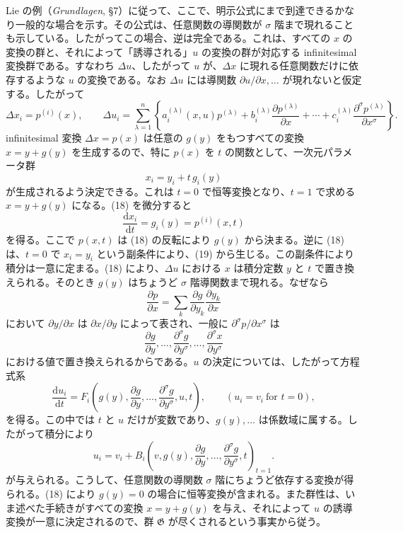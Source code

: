 \documentclass[11pt]{article}
\newcommand{\D}{\Delta}
\providecommand{\dd}{\mathrm d}
\providecommand{\G}{\mathfrak G}
\providecommand{\p}{\partial}
\begin{document}
Lie の例（\emph{Grundlagen}, \S{}7）に従って、ここで、明示公式にまで到達できるかなり一般的な場合を示す。その公式は、任意関数の導関数が \(\sigma\) 階まで現れることも示している。したがってこの場合、逆は完全である。これは、すべての \(x\) の変換の群と、それによって「誘導される」\(u\) の変換の群が対応する infinitesimal 変換群である。すなわち \(\D u\)、したがって \(u\) が、\(\D x\) に現れる任意関数だけに依存するような \(u\) の変換である。なお \(\D u\) には導関数 \(\p u/\p x,\ldots\) が現れないと仮定する。したがって
\[
\D x_i=p^{(i)}(x),\qquad
\D u_i=
\sum_{\lambda=1}^{n}\left\{
a_i^{(\lambda)}(x,u)p^{(\lambda)}
+b_i^{(\lambda)}\frac{\p p^{(\lambda)}}{\p x}
+\cdots+
c_i^{(\lambda)}\frac{\p^\sigma p^{(\lambda)}}{\p x^\sigma}
\right\}.
\]
infinitesimal 変換 \(\D x=p(x)\) は任意の \(g(y)\) をもつすべての変換 \(x=y+g(y)\) を生成するので、特に \(p(x)\) を \(t\) の関数として、一次元パラメータ群
\begin{equation}
x_i=y_i+t\,g_i(y)
\tag{18}
\end{equation}
が生成されるよう決定できる。これは \(t=0\) で恒等変換となり、\(t=1\) で求める \(x=y+g(y)\) になる。(18) を微分すると
\begin{equation}
\frac{\dd x_i}{\dd t}=g_i(y)=p^{(i)}(x,t)
\tag{19}
\end{equation}
を得る。ここで \(p(x,t)\) は (18) の反転により \(g(y)\) から決まる。逆に (18) は、\(t=0\) で \(x_i=y_i\) という副条件により、(19) から生じる。この副条件により積分は一意に定まる。(18) により、\(\D u\) における \(x\) は積分定数 \(y\) と \(t\) で置き換えられる。そのとき \(g(y)\) はちょうど \(\sigma\) 階導関数まで現れる。なぜなら
\[
\frac{\p p}{\p x}=\sum_k\frac{\p g}{\p y_k}\frac{\p y_k}{\p x}
\]
において \(\p y/\p x\) は \(\p x/\p y\) によって表され、一般に \(\p^\sigma p/\p x^\sigma\) は
\[
\frac{\p g}{\p y},\ldots,\frac{\p^\sigma g}{\p y^\sigma},\ldots,\frac{\p^\sigma x}{\p y^\sigma}
\]
における値で置き換えられるからである。\(u\) の決定については、したがって方程式系
\[
\frac{\dd u_i}{\dd t}
=
F_i\!\left(g(y),\frac{\p g}{\p y},\ldots,\frac{\p^\sigma g}{\p y^\sigma},u,t\right),
\qquad (u_i=v_i\ \text{for }t=0),
\]
を得る。この中では \(t\) と \(u\) だけが変数であり、\(g(y),\ldots\) は係数域に属する。したがって積分により
\[
u_i=v_i+
B_i\!\left(v,g(y),\frac{\p g}{\p y},\ldots,\frac{\p^\sigma g}{\p y^\sigma},t\right)_{t=1}.
\]
が与えられる。こうして、任意関数の導関数 \(\sigma\) 階にちょうど依存する変換が得られる。(18) により \(g(y)=0\) の場合に恒等変換が含まれる。また群性は、いま述べた手続きがすべての変換 \(x=y+g(y)\) を与え、それによって \(u\) の誘導変換が一意に決定されるので、群 \(\G\) が尽くされるという事実から従う。
\end{document}
